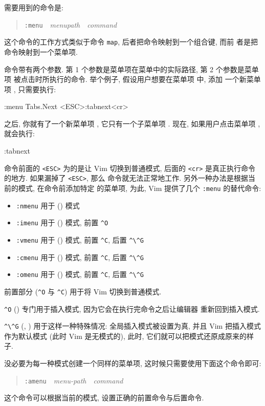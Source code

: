 需要用到的命令是:
\begin{quotation}
\texttt{:menu}\ \ \textit{menupath}\ \ \textit{command}
\end{quotation}
这个命令的工作方式类似于命令 \texttt{map}, 后者把命令映射到一个组合键, 而前
者是把命令映射到一个菜单项.

命令带有两个参数. 第 1 个参数是菜单项在菜单中的实际路径, 第 2 个参数是菜单项 
被点击时所执行的命令. 举个例子, 假设用户想要在菜单项  中, 添加 
一个新菜单项 , 只需要执行:
\begin{vimcmd}
:menu Tabs.Next <ESC>:tabnext<cr>
\end{vimcmd}
之后, 你就有了一个新菜单项 , 它只有一个子菜单项 .
现在, 如果用户点击菜单项 , 就会执行:
\begin{vimcmd}
:tabnext
\end{vimcmd}
命令前面的 \texttt{<ESC>} 为的是让 Vim 切换到普通模式,
后面的 \texttt{<cr>} 是真正执行命令的地方. 如果漏掉了 \texttt{<ESC>}, 那么 
命令就无法正常地工作. 另外一种办法是根据当前的模式, 在命令前添加特定
的菜单项, 为此, Vim 提供了几个 \texttt{:menu} 的替代命令:
\begin{itemize}
    \item \texttt{:nmenu} 用于 () 模式 
    \item \texttt{:imenu} 用于 () 模式, 前置
        \verb'^O'
    \item \texttt{:vmenu} 用于 () 模式, 前置
        \verb'^C', 后置 \verb'^\^G'
    \item \texttt{:cmenu} 用于 () 模式,
        前置 \verb'^C', 后置 \verb'^\^G'
    \item \texttt{:omenu} 用于  ()
        模式, 前置 \verb'^C', 后置 \verb'^\^G'
\end{itemize}
前置部分 (\verb'^O' 与 \verb'^C') 用于将 Vim 切换到普通模式.

\verb'^O' () 专门用于插入模式, 因为它会在执行完命令之后让编辑器
重新回到插入模式.

\verb'^\^G' (, ) 用于这样一种特殊情况:
全局插入模式被设置为真, 并且 Vim 把插入模式作为默认模式 (此时 Vim
是无模式的), 此时, 它们就可以把模式还原成原来的样子.
\begin{warning}
没必要为每一种模式创建一个同样的菜单项, 这时候只需要使用下面这个命令即可:
\begin{quotation}
\texttt{:amenu}\ \ \textit{menu-path}\ \ \textit{command}
\end{quotation}
这个命令可以根据当前的模式, 设置正确的前置命令与后置命令.
\end{warning}

